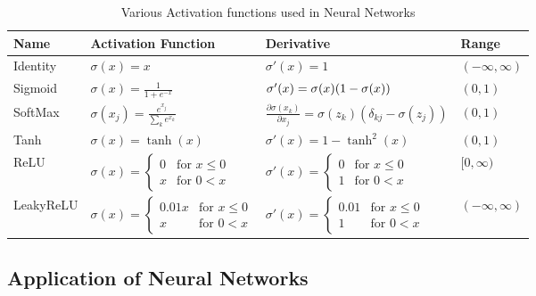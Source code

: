 \documentclass[reprint, english, nofootinbib]{revtex4-2}
\begin{document}
\begin{table}[]
\caption{\label{tab: activation functions}Various Activation functions used in Neural Networks}
\setlength{\tabcolsep}{20pt}
\renewcommand{\arraystretch}{2.5}
\begin{tabular}{llll}
    Name & Activation Function & Derivative & Range \\
    \hline\hline
    Identity &
    $\sigma(x) = x$  &
    $\sigma'(x) = 1$ &
    $(-\infty, \infty)$
    \\ \hline
    Sigmoid &
    $\sigma(x) = \frac{1}{1 + e^{-x}}$  &
    $\sigma'(x) =\sigma(x)\qty(1-\sigma(x))$ &
    $(0, 1)$
    \\ \hline
    SoftMax &
    $\sigma(x_j) = \frac{e^{x_j}}{\sum_k e^{x_k}}$  &
    $\frac{\partial \sigma(x_k)}{\partial x_j} = \sigma(z_k) (\delta_{kj} - \sigma(z_j))$ &
    $(0, 1)$
    \\ \hline
    Tanh &
    $\sigma(x) = \tanh(x)$  &
    $\sigma'(x) =  1 - \tanh^2(x)$ &
    $(0, 1)$
    \\ \hline
    ReLU    &
    $\sigma(x) = \left\{\begin{matrix}0 & \text{for } x \leq 0 \\ x & \text{for } 0 < x\end{matrix}\right.$ &
    $\sigma'(x) = \left\{\begin{matrix}0 & \text{for } x \leq 0 \\ 1 & \text{for } 0 < x\end{matrix}\right.$ &
    $[0, \infty)$
    \\ \hline
    LeakyReLU &
    $\sigma(x) = \left\{\begin{matrix}0.01x & \text{for } x \leq 0 \\ x & \text{for } 0 < x\end{matrix}\right.$ &
    $\sigma'(x) = \left\{\begin{matrix}0.01 & \text{for } x \leq 0 \\ 1 & \text{for } 0 < x\end{matrix}\right.$ &
    $(-\infty, \infty)$
    \\ \hline
\end{tabular}
\end{table}



\subsection{Application of Neural Networks\label{sect: application of Neural Networks}}
\end{document}
